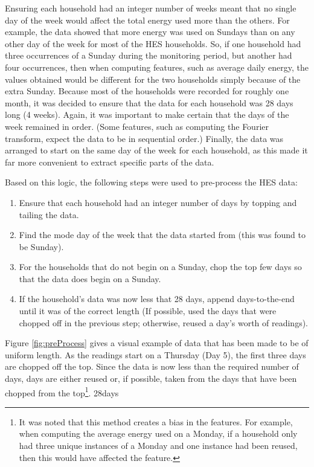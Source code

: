 Ensuring each household had an integer number of weeks meant that no single day of the week would affect the total energy used more than the others. For example, the data showed that more energy was used on Sundays than on any other day of the week for most of the HES households. So, if one household had three occurrences of a Sunday during the monitoring period, but another had four occurrences, then when computing features, such as average daily energy, the values obtained would be different for the two households simply because of the extra Sunday. Because most of the households were recorded for roughly one month, it was decided to ensure that the data for each household was 28 days long (4 weeks). Again, it was important to make certain that the days of the week remained in order. (Some features, such as computing the Fourier transform, expect the data to be in sequential order.) Finally, the data was arranged to start on the same day of the week for each household, as this made it far more convenient to extract specific parts of the data.

Based on this logic, the following steps were used to pre-process the HES data:

\begin{enumerate}
\item Ensure that each household had an integer number of days by topping and tailing the data.
\item Find the mode day of the week that the data started from (this was found to be Sunday).
\item For the households that do not begin on a Sunday, chop the top few days so that the data does begin on a Sunday.
\item If the household's data was now less that 28 days, append days-to-the-end until it was of the correct length (If possible, used the days that were chopped off in the previous step; otherwise, reused a day's worth of readings).
\end{enumerate}

Figure \ref{fig:preProcess} gives a visual example of data that has been made to be of uniform length. As the readings start on a Thursday (Day 5), the first three days are chopped off the top. Since the data is now less than the required number of days, days are either reused or, if possible, taken from the days that have been chopped from the top\footnote{It was noted that this method creates a bias in the features. For example, when computing the average energy used on a Monday, if a household only had three unique instances of a Monday and one instance had been reused, then this would have affected the feature.}.
\to28days

